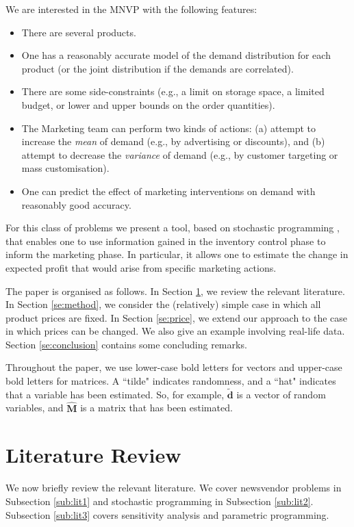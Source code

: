 \documentclass[a4paper,11pt]{article}
\begin{document}
We are interested in the MNVP with the following features:
\begin{itemize}
\item There are several products.
\item One has a reasonably accurate model of the demand distribution for each product (or the joint distribution if the demands are correlated).
\item There are some side-constraints (e.g., a limit on storage space, a limited budget, or lower and upper bounds on the order quantities).
\item The Marketing team can perform two kinds of actions: (a) attempt to increase the \emph{mean} of demand (e.g., by advertising or discounts), and (b) attempt to decrease the \emph{variance} of demand (e.g., by customer targeting or mass customisation).
\item One can predict the effect of marketing interventions on demand with reasonably good accuracy.
\end{itemize}

For this class of problems we present a tool, based on stochastic programming \cite{Da55,We84}, that enables one to use information gained in the inventory control phase to inform the marketing phase. In particular, it allows one to estimate the change in expected profit that would arise from specific marketing actions.

The paper is organised as follows. In Section \ref{se:literature}, we review the relevant literature. In Section \ref{se:method}, we consider the (relatively) simple case in which all product prices are fixed. In Section \ref{se:price}, we extend our approach to the case in which prices can be changed. We also give an example involving real-life data. Section \ref{se:conclusion} contains some concluding remarks.

Throughout the paper, we use lower-case bold letters for vectors and upper-case bold letters for matrices. A ``tilde" indicates randomness, and a ``hat" indicates that a variable has been estimated. So, for example, $\mathbf{\tilde d}$ is a vector of random variables, and $\hat{\mathbf{M}}$ is a matrix that has been estimated.

\section{Literature Review} \label{se:literature}

We now briefly review the relevant literature. We cover newsvendor problems in Subsection \ref{sub:lit1} and stochastic programming in Subsection \ref{sub:lit2}. Subsection  \ref{sub:lit3} covers sensitivity analysis and parametric programming.
\end{document}
